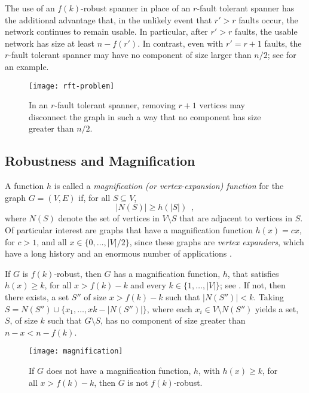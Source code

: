 \documentclass{patmorin}
\begin{document}
The use of an $f(k)$-robust spanner in place of an $r$-fault tolerant
spanner has the additional advantage that, in the unlikely event that $r'>
r$ faults occur, the network continues to remain usable.  In particular,
after $r'>r$ faults, the usable network has size at least $n-f(r')$. In
contrast, even with $r'=r+1$ faults, the $r$-fault tolerant spanner may
have no component of size larger than $n/2$; see 
for an example.

\begin{figure}
  \begin{center}
    \texttt{[image: rft-problem]}
  \end{center}
  \caption{In an $r$-fault tolerant spanner, removing $r+1$ vertices may
  disconnect the graph in such a way that no component has size greater
  than $n/2$.}
\end{figure}

\subsection{Robustness and Magnification}

A function $h$ is called a \emph{magnification
(or vertex-expansion) function} for the graph $G=(V,E)$ if, for all
$S\subseteq V$,
\[
    |N(S)| \ge h(|S|) \enspace ,
\]
where $N(S)$ denote the set of vertices in $V\setminus S$ that are
adjacent to vertices in $S$.  Of particular interest are graphs
that have a magnification function $h(x)=cx$, for $c>1$, and all
$x\in\{0,\ldots,|V|/2\}$, since these graphs are \emph{vertex expanders},
which have a long history and an enormous number of applications
\cite{hlw06}.

If $G$ is $f(k)$-robust, then $G$ has a magnification function,
$h$, that satisfies $h(x) \ge k$, for all $x> f(k)-k$ and every
$k\in\{1,\ldots,|V|\}$; see .  If not, then
there exists, a set $S''$ of size $x>f(k)-k$ such that $|N(S'')|<
k$.  Taking $S=N(S'')\cup\{x_1,\ldots,x{k-|N(S'')|}\}$, where each
$x_i\in V\setminus N(S'')$ yields a set, $S$, of size $k$ such that
$G\setminus S$, has no component of size greater than $n-x < n-f(k)$.

\begin{figure}
  \begin{center}
    \texttt{[image: magnification]}
  \end{center}
  \caption{If $G$ does not have a magnification function, $h$, with
  $h(x)\ge k$, for all $x> f(k)-k$, then $G$ is not $f(k)$-robust.}
\end{figure}
\end{document}
